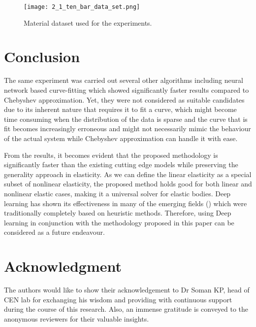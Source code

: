\documentclass[conference]{IEEEtran}
\begin{document}
\begin{figure}[htbp]
\centerline{\texttt{[image: 2\_1\_ten\_bar\_data\_set.png]}}
\caption{Material dataset used for the experiments.}
\label{fig4}
\end{figure}

\section{Conclusion}
\label{conclusion}
The same experiment was carried out several other algorithms including neural network based curve-fitting which showed significantly faster results compared to Chebyshev approximation. Yet, they were not considered as suitable candidates due to its inherent nature that requires it to fit a curve, which might become time consuming when the distribution of the data is sparse and the curve that is fit becomes increasingly erroneous and might not necessarily mimic the behaviour of the actual system while Chebyshev approximation can handle it with ease.

From the results, it becomes evident that the proposed methodology is significantly faster than the existing cutting edge models while preserving the generality approach in elasticity. As we can define the linear elasticity as a special subset of nonlinear elasticity, the proposed method holds good for both linear and nonlinear elastic cases, making it a universal solver for elastic bodies. Deep learning \cite{34} has shown its effectiveness in many of the emerging fields (\cite{32,33}) which were traditionally completely based on heuristic methods. Therefore, using Deep learning in conjunction with the methodology proposed in this paper can be considered as a future endeavour.



\section*{Acknowledgment}
The authors would like to show their acknowledgement to Dr Soman KP, head of CEN lab for exchanging his wisdom and providing with continuous support during the course of this research. Also, an immense gratitude is conveyed to the anonymous reviewers for their valuable insights.
\end{document}
